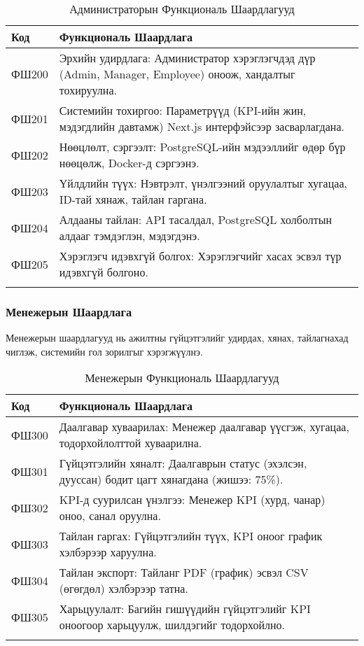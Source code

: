 \documentclass[a4paper]{report} %
\begin{document}
\begin{longtable}{|p{2cm}|p{8.5cm}|}
\hline
\textbf{Код} & \textbf{Функциональ Шаардлага} \\ \hline
\endhead
ФШ200 & Эрхийн удирдлага: Администратор хэрэглэгчдэд дүр (Admin, Manager, Employee) оноож, хандалтыг тохируулна. \\ \hline
ФШ201 & Системийн тохиргоо: Параметрүүд (KPI-ийн жин, мэдэгдлийн давтамж) Next.js интерфэйсээр засварлагдана. \\ \hline
ФШ202 & Нөөцлөлт, сэргээлт: PostgreSQL-ийн мэдээллийг өдөр бүр нөөцөлж, Docker-д сэргээнэ. \\ \hline
ФШ203 & Үйлдлийн түүх: Нэвтрэлт, үнэлгээний оруулалтыг хугацаа, ID-тай хянаж, тайлан гаргана. \\ \hline
ФШ204 & Алдааны тайлан: API тасалдал, PostgreSQL холболтын алдааг тэмдэглэн, мэдэгдэнэ. \\ \hline
ФШ205 & Хэрэглэгч идэвхгүй болгох: Хэрэглэгчийг хасах эсвэл түр идэвхгүй болгоно. \\ \hline
\caption{Администраторын Функциональ Шаардлагууд} \label{tab:admin_requirements}
\end{longtable}

\subsubsection{Менежерын Шаардлага}
Менежерын шаардлагууд нь ажилтны гүйцэтгэлийг удирдах, хянах, тайлагнахад чиглэж, системийн гол зорилгыг хэрэгжүүлнэ.

\begin{longtable}{|p{2cm}|p{8.5cm}|}
\hline
\textbf{Код} & \textbf{Функциональ Шаардлага} \\ \hline
\endhead
ФШ300 & Даалгавар хуваарилах: Менежер даалгавар үүсгэж, хугацаа, тодорхойлолттой хуваарилна. \\ \hline
ФШ301 & Гүйцэтгэлийн хяналт: Даалгаврын статус (эхэлсэн, дууссан) бодит цагт хянагдана (жишээ: 75\%). \\ \hline
ФШ302 & KPI-д суурилсан үнэлгээ: Менежер KPI (хурд, чанар) оноо, санал оруулна. \\ \hline
ФШ303 & Тайлан гаргах: Гүйцэтгэлийн түүх, KPI оноог график хэлбэрээр харуулна. \\ \hline
ФШ304 & Тайлан экспорт: Тайланг PDF (график) эсвэл CSV (өгөгдөл) хэлбэрээр татна. \\ \hline
ФШ305 & Харьцуулалт: Багийн гишүүдийн гүйцэтгэлийг KPI оноогоор харьцуулж, шилдэгийг тодорхойлно. \\ \hline
\caption{Менежерын Функциональ Шаардлагууд} \label{tab:manager_requirements}
\end{longtable}
\end{document}
